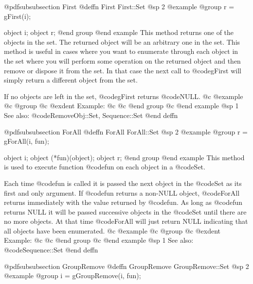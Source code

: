 @pdfsubsubsection {First}
@deffn {First} First::Set
@sp 2
@example
@group
r = gFirst(i);

object  i;
object  r;
@end group
@end example
This method returns one of the objects in the set.  The returned
object will be an arbitrary one in the set.  This method is useful
in cases where you want to enumerate through each object in the
set where you will perform some operation on the returned object and
then remove or dispose it from the set.  In that case the next call
to @code{gFirst} will simply return a different object from the set.

If no objects are left in the set, @code{gFirst} returns @code{NULL}.
@c @example
@c @group
@c @exdent Example:
@c 
@c @end group
@c @end example
@sp 1
See also:  @code{RemoveObj::Set, Sequence::Set}
@end deffn















@pdfsubsubsection {ForAll}
@deffn {ForAll} ForAll::Set
@sp 2
@example
@group
r = gForAll(i, fun);

object  i;
object  (*fun)(object);
object  r;
@end group
@end example
This method is used to execute function @code{fun} on each object in a @code{Set}.

Each time @code{fun} is called it is passed the next object in the @code{Set}
as its first and only argument.  If @code{fun} returns a non-NULL
object, @code{ForAll} returns immediately with the value returned by
@code{fun}.  As long as @code{fun} returns NULL it will be passed
successive objects in the @code{Set} until there are no more objects.  At
that time @code{ForAll} will just return NULL indicating that all
objects have been enumerated.
@c @example
@c @group
@c @exdent Example:
@c 
@c @end group
@c @end example
@sp 1
See also:  @code{Sequence::Set}
@end deffn



















@pdfsubsubsection {GroupRemove}
@deffn {GroupRemove} GroupRemove::Set
@sp 2
@example
@group
i = gGroupRemove(i, fun);

